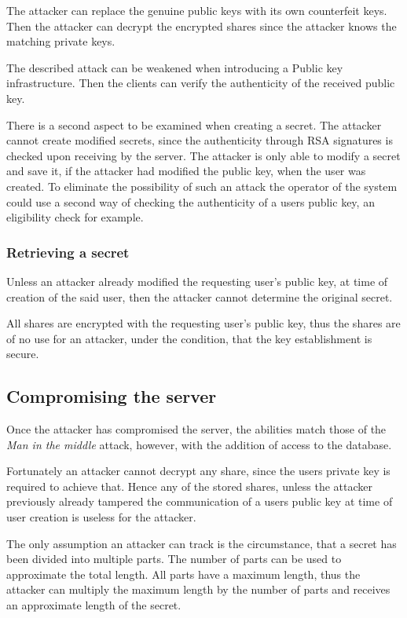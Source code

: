 The attacker can replace the genuine public keys with its own counterfeit keys.
Then the attacker can decrypt the encrypted shares since the attacker knows the
matching private keys.

The described attack can be weakened when introducing a Public key
infrastructure. Then the clients can verify the authenticity of the received
public key.

There is a second aspect to be examined when creating a secret. The attacker
cannot create modified secrets, since the authenticity through RSA signatures
is checked upon receiving by the server. The attacker is only able to modify a
secret and save it, if the attacker had modified the public key, when the user
was created. To eliminate the possibility of such an attack the operator of the
system could use a second way of checking the authenticity of a users public
key, an eligibility check for example.

\subsubsection{Retrieving a secret}

Unless an attacker already modified the requesting user's public key, at time of
creation of the said user, then the attacker cannot determine the original
secret.

All shares are encrypted with the requesting user's public key, thus the shares
are of no use for an attacker, under the condition, that the key establishment
is secure.

\subsection{Compromising the server}

Once the attacker has compromised the server, the abilities match those of the
\textit{Man in the middle} attack, however, with the addition of access to the
database.

Fortunately an attacker cannot decrypt any share, since the users private key
is required to achieve that. Hence any of the stored shares, unless the
attacker previously already tampered the communication of a users public key at
time of user creation is useless for the attacker.

The only assumption an attacker can track is the circumstance, that a secret
has been divided into multiple parts. The number of parts can be used to
approximate the total length. All parts have a maximum length, thus the
attacker can multiply the maximum length by the number of parts and receives an
approximate length of the secret.

